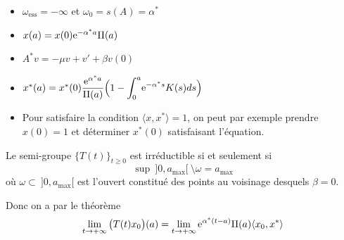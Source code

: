 \begin{frame} 
    \begin{itemize}
        \item $\omega_{\text{ess}}=-\infty$ et $\omega_0 = s(A) = \alpha^*$ \pause
        \item $x(a) = x(0)\mathrm{e}^{-\alpha^*a}\Pi(a)$ \pause
        \item $A^*v = -\mu v + v' + \beta v(0)$ \pause
        \item $x^*(a) = x^*(0)\dfrac{\mathrm{e}^{\alpha^*a}}{\Pi(a)}\Big(1-\displaystyle{\int_0^a}\mathrm{e}^{-\alpha^*s}K(s)d s\Big)$ \pause 
        \item Pour satisfaire la condition $\langle x,x^*\rangle =1$, on peut par exemple prendre $x(0)=1$ et déterminer $x^*(0)$ satisfaisant l'équation. \pause
    \end{itemize}
    \begin{proposition}
        Le semi-groupe $\big\{T(t)\big\}_{t \geq 0}$ est irréductible si et seulement si 
        \begin{equation*}
            \sup \ ]0,a_{\max}[ \ \setminus \omega = a_{\max}
        \end{equation*}
        où $\omega \subset \ ]0,a_{\max}[$ est l'ouvert constitué des points au voisinage desquels $\beta=0$.
    \end{proposition}
    \pause
    Donc on a par le théorème
    \begin{equation*}
        \lim_{t \to +\infty} \big(T(t)x_0\big)(a) = \lim_{t \to +\infty} \mathrm{e}^{\alpha^*(t-a)}\Pi(a)\langle x_0,x^*\rangle
    \end{equation*}
\end{frame}